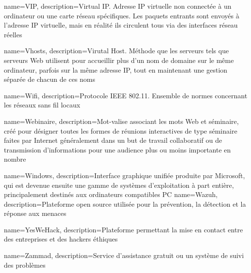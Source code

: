 
{
    name=VIP,
    description={Virtual IP. Adresse IP virtuelle non connectée à un ordinateur ou une carte réseau spécifiques. Les paquets entrants sont envoyés à l'adresse IP virtuelle, mais en réalité ils circulent tous via des interfaces réseau réelles}
}

{
    name=Vhosts,
    description={Virutal Host. Méthode que les serveurs tels que serveurs Web utilisent pour accueillir plus d'un nom de domaine sur le même ordinateur, parfois sur la même adresse IP, tout en maintenant une gestion séparée de chacun de ces noms}
}

{
    name=Wifi,
    description={Protocole IEEE 802.11. Ensemble de normes concernant les réseaux sans fil locaux}
}

{
    name=Webinaire,
    description={Mot-valise associant les mots Web et séminaire, créé pour désigner toutes les formes de réunions interactives de type séminaire faites par Internet généralement dans un but de travail collaboratif ou de transmission d'informations pour une audience plus ou moins importante en nombre}
}


{
    name=Windows,
    description={Interface graphique unifiée produite par Microsoft, qui est devenue ensuite une gamme de systèmes d’exploitation à part entière, principalement destinés aux ordinateurs compatibles PC}
}
{
    name=Wazuh,
    description={Plateforme open source utilisée pour la prévention, la détection et la réponse aux menaces}
}


{
    name=YesWeHack,
    description={Plateforme permettant la mise en contact entre des entreprises et des hackers éthiques}
}

{
    name=Zammad,
    description={Service d'assistance gratuit ou un système de suivi des problèmes}
}

































